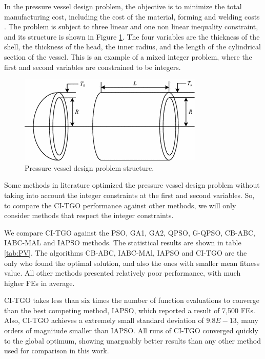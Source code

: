 In the pressure vessel design problem, the objective is to minimize the total manufacturing cost, including the cost of the material, forming and welding costs \citep{PV}. The problem is subject to three linear and one non linear inequality constraint, and its structure is shown in Figure \ref{fig:PV}. The four variables are the thickness of the shell, the thickness of the head, the inner radius, and the length of the cylindrical section of the vessel. This is an example of a mixed integer problem, where the first and second variables are constrained to be integers.


\begin{figure}[h]
\begin{center}
\includegraphics[scale=0.6]{Imgs/PV.png}
\end{center}
\captionsetup{justification=centering}
\caption{Pressure vessel design problem structure.}\label{fig:PV}
\end{figure}


Some methods in literature optimized the pressure vessel design problem without taking into account the integer constraints at the first and second variables. So, to compare the CI-TGO performance against other methods, we will only consider methods that respect the integer constraints.



We compare CI-TGO against the PSO, GA1, GA2, QPSO, G-QPSO, CB-ABC, IABC-MAL and IAPSO methods. The statistical results are shown in table \ref{tab:PV}. The algorithms CB-ABC, IABC-MAl, IAPSO and CI-TGO are the only who found the optimal solution, and also the ones with smaller mean fitness value. All other methods presented relatively poor performance, with much higher FEs in average.

CI-TGO takes less than six times the number of function evaluations to converge than the best competing method, IAPSO, which reported a result of 7,500 FEs. Also, CI-TGO achieves a extremely small standard deviation of $9.8E-13$, many orders of magnitude smaller than IAPSO. All runs of CI-TGO converged quickly to the global optimum, showing unarguably better results than any other method used for comparison in this work.



